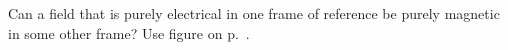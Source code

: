Can a field that is purely electrical in one frame of reference be purely
magnetic in some other frame? Use
figure  on p.~\pageref{fig:e-b-lorentz}.
